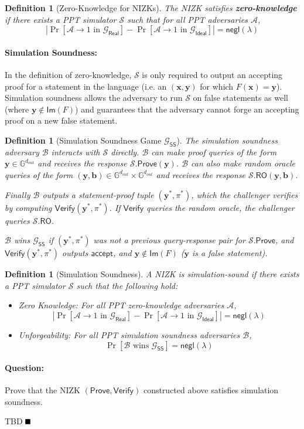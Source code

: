 \documentclass[11pt]{article}
\newtheorem{definition}[theorem]{Definition}
\newenvironment{solution}{\color{blue}\noindent{\bf Solution}\hspace*{1em}}{\qed\medskip}
\newcommand{\qed}{\mbox{}\hspace*{\fill}\nolinebreak\mbox{$\rule{0.6em}{0.6em}$}} %
\numberwithin{equation}{section}
\newcommand{\bfb}{\mathbf{b}}
\newcommand{\bfx}{\mathbf{x}}
\newcommand{\bfy}{\mathbf{y}}
\newcommand{\bbG}{\mathbb{G}}
\newcommand{\cA}{\mathcal{A}}
\newcommand{\cB}{\mathcal{B}}
\newcommand{\cG}{\mathcal{G}}
\newcommand{\cS}{\mathcal{S}}
\newcommand{\Prove}{\mathsf{Prove}}
\newcommand{\Verify}{\mathsf{Verify}}
\newcommand{\RO}{\mathsf{RO}}
\newcommand{\secp}{\lambda}
\newcommand{\negl}{\mathsf{negl}}
\begin{document}
\begin{definition}[Zero-Knowledge for NIZKs]\label{def:zk-for-nizks}
    The NIZK satisfies \textbf{zero-knowledge} if there exists a PPT simulator $\cS$ such that for all PPT adversaries $\cA$, 
    \[\left|\Pr[\cA \to 1 \text{ in } \cG_{\mathsf{Real}}] - \Pr[\cA \to 1 \text{ in } \cG_{\mathsf{Ideal}}]\right| = \negl(\secp)\]
\end{definition}

\paragraph{Simulation Soundness:} In the definition of zero-knowledge, $\cS$ is only required to output an accepting proof for a statement in the language (i.e. an $(\bfx, \bfy)$ for which $F(\bfx) = \bfy$). Simulation soundness allows the adversary to run $\cS$ on false statements as well (where $\bfy \notin \mathsf{Im}(F)$) and guarantees that the adversary cannot forge an accepting proof on a new false statement.

\begin{definition}[Simulation Soundness Game $\cG_{\mathsf{SS}}$]
    The simulation soundness adversary $\cB$ interacts with $\cS$ directly. $\cB$ can make proof queries of the form $\bfy \in \bbG^{d_{out}}$ and receives the response $\cS.\Prove(\bfy)$. $\cB$ can also make random oracle queries of the form $(\bfy, \bfb) \in \bbG^{d_{out}} \times \bbG^{d_{out}}$ and receives the response $\cS.\RO(\bfy, \bfb)$.

    Finally $\cB$ outputs a statement-proof tuple $(\bfy^*, \pi^*)$, which the challenger verifies by computing $\Verify(\bfy^*, \pi^*)$. If $\Verify$ queries the random oracle, the challenger queries $\cS.\RO$. 
    
    $\cB$ wins $\cG_{\mathsf{SS}}$ if $(\bfy^*, \pi^*)$ was not a previous query-response pair for $\cS.\Prove$, and $\Verify(\bfy^*, \pi^*)$ outputs $\mathsf{accept}$, and $\bfy \notin \mathsf{Im}(F)$ ($\bfy$ is a false statement).
\end{definition}

\begin{definition}[Simulation Soundness]
    A NIZK is simulation-sound if there exists a PPT simulator $\cS$ such that the following hold:
    \begin{itemize}
        \item \textit{Zero Knowledge:} For all PPT zero-knowledge adversaries $\cA$,
        \[\left|\Pr[\cA \to 1 \text{ in } \cG_{\mathsf{Real}}] - \Pr[\cA \to 1 \text{ in } \cG_{\mathsf{Ideal}}]\right| = \negl(\secp)\]
        \item \textit{Unforgeability:} For all PPT simulation soundness adversaries $\cB$,
        \[\Pr[\cB \text{ wins } \cG_{\mathsf{SS}}] = \negl(\secp)\]
    \end{itemize}
\end{definition}

\paragraph{Question:} Prove that the NIZK $(\Prove, \Verify)$ constructed above satisfies simulation soundness.

\vspace{5mm}
\begin{solution}
TBD
\end{solution}
\end{document}
